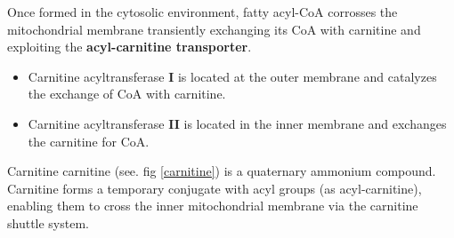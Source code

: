 \documentclass[../main.tex]{subfiles}
\begin{document}
\begin{figure}[H]
	\centering
	\hfil
	\caption{}
\end{figure}
\noindent
Once formed in the cytosolic environment, fatty acyl-CoA corrosses the mitochondrial membrane transiently exchanging its CoA with carnitine and exploiting the \textbf{acyl-carnitine transporter}.
\begin{itemize}
	\item Carnitine acyltransferase \textbf{I} is located at the outer membrane and catalyzes the exchange of CoA with carnitine. 
	\item Carnitine acyltransferase \textbf{II} is located in the inner membrane and exchanges the carnitine for CoA. 
\end{itemize}
		
\begin{DefWithTitle}{Carnitine}
	\gls{carnitine} (see. fig \ref{carnitine}) is a quaternary ammonium compound. Carnitine forms a temporary conjugate with acyl groups (as acyl-carnitine), enabling them to cross the inner mitochondrial membrane via the carnitine shuttle system.
\end{DefWithTitle}
\end{document}
